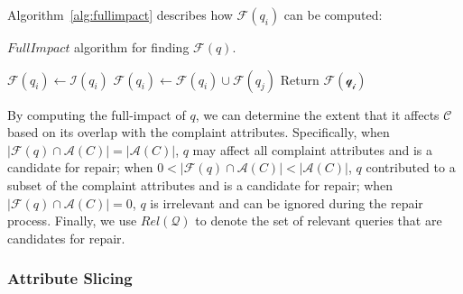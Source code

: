 
Algorithm~\ref{alg:fullimpact} describes how $\mathcal{F}(q_i)$ can be computed:

\begin{algorithm}[htbp]
\caption{$FullImpact$ algorithm for finding $\mathcal{F}(q)$.}
\label{alg:fullimpact}
\begin{algorithmic}
\STATE $\mathcal{F}(q_i) \leftarrow \mathcal{I}(q_i)$
\STATE $\mathcal{F}(q_i) \leftarrow \mathcal{F}(q_i) \cup \mathcal{F}(q_j)$
\ENDIF
\ENDFOR
\STATE Return $\mathcal{F}(\mathcal{q_i})$
\end{algorithmic}
\end{algorithm}

By computing the full-impact of $q$, we can determine the extent that it affects $\mathcal{C}$
based on its overlap with the complaint attributes.
Specifically, 
when $|\mathcal{F}(q) \cap \mathcal{A}(C)|=|\mathcal{A}(C)|$, $q$ may affect all complaint attributes and is a candidate for repair; 
when $0 < |\mathcal{F}(q) \cap \mathcal{A}(C)| < |\mathcal{A}(C)|$, 
$q$ contributed to a subset of the complaint attributes and is a candidate for repair;
when $|\mathcal{F}(q) \cap \mathcal{A}(C)|=0$, $q$ is irrelevant 
and can be ignored during the repair process.
Finally, we use $Rel\mathcal{(Q)}$ to denote the set of relevant queries that are candidates for repair.

\subsubsection{Attribute Slicing}

